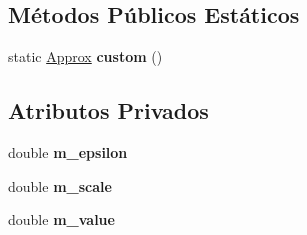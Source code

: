 \subsection*{Métodos Públicos Estáticos}
\begin{DoxyCompactItemize}
\item 
static \hyperlink{classCatch_1_1Detail_1_1Approx}{Approx} {\bfseries custom} ()\hypertarget{classCatch_1_1Detail_1_1Approx_aaf86dc0ee92272ac2d9839197a07951d}{}\label{classCatch_1_1Detail_1_1Approx_aaf86dc0ee92272ac2d9839197a07951d}

\end{DoxyCompactItemize}
\subsection*{Atributos Privados}
\begin{DoxyCompactItemize}
\item 
double {\bfseries m\+\_\+epsilon}\hypertarget{classCatch_1_1Detail_1_1Approx_af17c8e869ae7a55d14b99eb18e178114}{}\label{classCatch_1_1Detail_1_1Approx_af17c8e869ae7a55d14b99eb18e178114}

\item 
double {\bfseries m\+\_\+scale}\hypertarget{classCatch_1_1Detail_1_1Approx_a65e9bdab9113ff3300b45f0a4e048dd7}{}\label{classCatch_1_1Detail_1_1Approx_a65e9bdab9113ff3300b45f0a4e048dd7}

\item 
double {\bfseries m\+\_\+value}\hypertarget{classCatch_1_1Detail_1_1Approx_af7aeef703bd591f5ec85407b1dac053c}{}\label{classCatch_1_1Detail_1_1Approx_af7aeef703bd591f5ec85407b1dac053c}

\end{DoxyCompactItemize}
